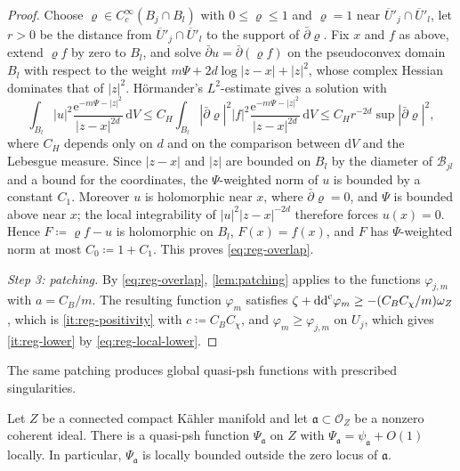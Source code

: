 \documentclass[11pt,a4paper]{amsart}
\theoremstyle{definition}
\begin{document}
\begin{proof}
Choose $\varrho\in C^\infty_c(B_j\cap B_l)$ with $0\le\varrho\le1$ and
$\varrho=1$ near $\overline U{}'_j\cap\overline U{}'_l$, let $r>0$ be the
distance from $\overline U{}'_j\cap\overline U{}'_l$ to the support of
$\bar\partial\varrho$. Fix $x$
and $f$ as above, extend $\varrho f$ by zero to $B_l$, and solve
$\bar\partial u=\bar\partial(\varrho f)$ on the pseudoconvex domain $B_l$
with respect to the weight $m\Psi+2d\log|z-x|+|z|^2$, whose complex
Hessian dominates that of $|z|^2$. H\"ormander's $L^2$-estimate
\cite[Chapter~VIII, \S6]{DemCADG} gives a solution with
\[
  \int_{B_l}|u|^2\frac{\mathrm{e}^{-m\Psi-|z|^2}}{|z-x|^{2d}}\,\mathrm{d}V
  \le C_H\int_{B_l}|\bar\partial\varrho|^2|f|^2
  \frac{\mathrm{e}^{-m\Psi-|z|^2}}{|z-x|^{2d}}\,\mathrm{d}V
  \le C_Hr^{-2d}\sup|\bar\partial\varrho|^2 ,
\]
where $C_H$ depends only on $d$ and on the comparison between
$\mathrm{d}V$ and the Lebesgue measure. Since $|z-x|$ and $|z|$ are bounded
on $B_l$ by the diameter of $\mathcal B_{jl}$ and a bound for the
coordinates, the $\Psi$-weighted norm of $u$ is bounded by a constant $C_1$. Moreover $u$
is holomorphic near $x$, where $\bar\partial\varrho=0$, and $\Psi$ is
bounded above near $x$; the local integrability of $|u|^2|z-x|^{-2d}$
therefore forces $u(x)=0$. Hence $F\coloneqq\varrho f-u$ is holomorphic on
$B_l$, $F(x)=f(x)$, and $F$ has $\Psi$-weighted norm at most $C_0\coloneqq
1+C_1$. This proves \eqref{eq:reg-overlap}.

\emph{Step 3: patching.} By \eqref{eq:reg-overlap}, \cref{lem:patching}
applies to the functions $\varphi_{j,m}$ with $a=C_B/m$. The resulting
function $\varphi_m$ satisfies
$\zeta+\mathrm{dd}^{\mathrm{c}}\varphi_m\ge-(C_BC_\chi/m)\omega_Z$, which is
\ref{it:reg-positivity} with $c\coloneqq C_BC_\chi$, and
$\varphi_m\ge\varphi_{j,m}$ on $U_j$, which gives \ref{it:reg-lower} by
\eqref{eq:reg-local-lower}.
\end{proof}

The same patching produces global quasi-psh functions with prescribed
singularities.

\begin{lemma}\label{lem:ideal-function}
Let $Z$ be a connected compact K\"ahler manifold and let
$\mathfrak a\subset\mathcal O_Z$ be a nonzero coherent ideal. There is a
quasi-psh function $\Psi_{\mathfrak a}$ on $Z$ with
$\Psi_{\mathfrak a}=\psi_{\mathfrak a}+O(1)$ locally. In particular,
$\Psi_{\mathfrak a}$ is locally bounded outside the zero locus of
$\mathfrak a$.
\end{lemma}
\end{document}
